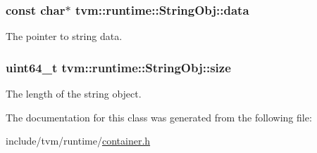 \subsubsection[{\texorpdfstring{data}{data}}]{\setlength{\rightskip}{0pt plus 5cm}const char$\ast$ tvm\+::runtime\+::\+String\+Obj\+::data}\hypertarget{classtvm_1_1runtime_1_1StringObj_a4ab9dd883ceed3efccf663acfbcd152f}{}\label{classtvm_1_1runtime_1_1StringObj_a4ab9dd883ceed3efccf663acfbcd152f}


The pointer to string data. 

\subsubsection[{\texorpdfstring{size}{size}}]{\setlength{\rightskip}{0pt plus 5cm}uint64\+\_\+t tvm\+::runtime\+::\+String\+Obj\+::size}\hypertarget{classtvm_1_1runtime_1_1StringObj_a866c6a8805c30f6cc4faac2298985d23}{}\label{classtvm_1_1runtime_1_1StringObj_a866c6a8805c30f6cc4faac2298985d23}


The length of the string object. 



The documentation for this class was generated from the following file\+:\begin{DoxyCompactItemize}
\item 
include/tvm/runtime/\hyperlink{runtime_2container_8h}{container.\+h}\end{DoxyCompactItemize}
